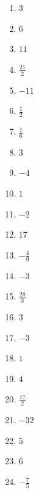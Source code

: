 \documentclass[parskip=half-]{scrartcl}
\begin{document}
\begin{solution}
    \begin{enumerate}
        \item $3$
        \item $6$
        \item $11$
        \item $\frac{21}{2}$
        \item $-11$
        \item $\frac{1}{2}$
        \item $\frac{1}{6}$
        \item $3$
        \item $-4$
        \item $1$
        \item $-2$
        \item $17$
        \item $- \frac{4}{9}$
        \item $-3$
        \item $\frac{28}{3}$
        \item $3$
        \item $-3$
        \item $1$
        \item $4$
        \item $\frac{17}{2}$
        \item $-32$
        \item $5$
        \item $6$
        \item $- \frac{7}{5}$
    \end{enumerate}
\end{solution}
\end{document}
